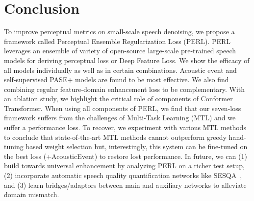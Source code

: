 \documentclass{article}
\begin{document}
\section{Conclusion}
To improve perceptual metrics on small-scale speech denoising, we propose a framework called Perceptual Ensemble Regularization Loss (PERL).
PERL leverages an ensemble of variety of open-source large-scale pre-trained speech models for deriving perceptual loss or Deep Feature Loss.
We show the efficacy of all models individually as well as in certain combinations.
Acoustic event and self-supervised PASE+ models are found to be most effective.
We also find combining regular feature-domain enhancement loss to be complementary.
With an ablation study, we highlight the critical role of components of Conformer Transformer.
When using all components of PERL, we find that our seven-loss framework suffers from the challenges of Multi-Task Learning (MTL) and we suffer a performance loss.
To recover, we experiment with various MTL methods to conclude that state-of-the-art MTL methods cannot outperform greedy hand-tuning based weight selection but, interestingly, this system can be fine-tuned on the best loss (+AcousticEvent) to restore lost performance.
In future, we can (1) build towards universal enhancement by analyzing PERL on a richer test setup, (2) incorporate automatic speech quality quantification networks like SESQA~\cite{serra2020sesqa}, and (3) learn bridges/adaptors between main and auxiliary networks to alleviate domain mismatch.

\clearpage


\end{document}
